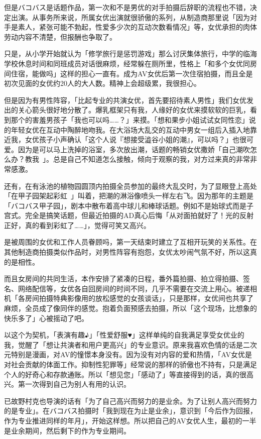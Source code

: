 \documentclass[12pt,UTF8]{ctexbook}
\begin{document}
但是バコバス是话题作品，第一次和不是男优的对手拍摄后辞职的流程也不错，决定出演。从事务所来说，所属女优出演就很骄傲的系列，从制造商那里说「因为对手是素人，紧张可能不勃起，性爱多少次的互动次数看情况」等，女优承担的肉体劳动内容不清楚，但报酬也争取了。

只是，从小学开始就认为「修学旅行是惩罚游戏」那么讨厌集体旅行，中学的临海学校休息时间和同班成员对话很麻烦，经常躲在厕所里，性格上「和多个女优同房间住宿，能做吗」这样的担心一直有。成为AV女优后第一次住宿拍摄，而且全是初次见面的女优约20人的大人数。精神上会超级累，我很担心。

但是因为有男性阵容，「比起专业的共演女优，首先要招待素人男性」我们女优发出的关心箭头很好地分散了。爆乳框架只有我，人缘好的女优来摸软软的巨乳，看到那个的害羞男孩子「我也可以吗……？」来摸。「想和果步小姐试试女同性恋」说的年轻女优在互动中陶醉地吻我。在大浴场大乱交的互动中男女一组后入插入地靠近我，女优孩子小声确认「这个人说『想接受澁谷小姐的潮』，可以吗？」也很可爱。因为是可以马上洗掉的浴室，多次放出潮，话题的畅销女优撒娇「自己潮吹怎么办？教我~」。总是自己不知道怎么接触，倾向于观察的我，对方过来真的非常非常感激。

还有，在有泳池的植物园圆顶内拍摄全员参加的最终大乱交时，为了显眼登上高处「在甲子园架起彩虹~」叫着，把潮的淋浴像喷头一样左右飞。因为那年的主题是「バコバス甲子园」，剧本中散布着高中球儿和棒球话题。例如不是始球式而是子宫式。完全是搞笑话题，但最近拍摄的AD真心后悔「从对面拍就好了！光的反射正好，真的看到彩虹了……」，觉得可笑又高兴。

是被周围的女优和工作人员眷顾吗，第一天结束时建立了互相开玩笑的关系性。在其他制造商拍摄类似作品时，对男性阵容有抱怨，女优太吵闹气氛不好，所以这真的是相性。

而且女房间的共同生活，本作安排了紧凑的日程，番外篇拍摄、拍立得拍摄、签名、网络配信等，女优各自回房间的时间不同，几乎不需要在交流上用心。被递相机「各房间拍摄特典影像用的放松感觉的女孩谈话」，只是那样，女优间也共享了麻烦，全员成了像同伴的感觉。抱着负面预感去拍摄，所以「这个现场，比想象的快乐多了」心被摇动了吧。

以这个为契机，「表演有趣♪」「性爱舒服♥」这样单纯的自我满足享受女优业的我，觉醒了「想让共演者和用户更高兴」的专业意识。原来我喜欢色情的话是二次元特别是漫画，对AV的憧憬本身没有。因为没有对内容的爱和热情，「AV女优是对社会贡献的体面工作。抑制性犯罪等」经常说的那样的骄傲也不持有，只是满足个人的好奇心和存款通账。所以「想见您」「感动了」等直接得到的话，真的很高兴。第一次得到自己为别人有用的认识。

已故野村克也导演的话有「为了自己高兴而努力的是业余。为了让别人高兴而努力的是专业」。在バコバス拍摄时「我到现在为止是业余」，意识到「今后作为回报，作为专业推进同样的年月」，开始这样想。所以把自己的AV女优人生，最初的一半是业余期间，然后剩下的作为专业期间。
\end{document}
